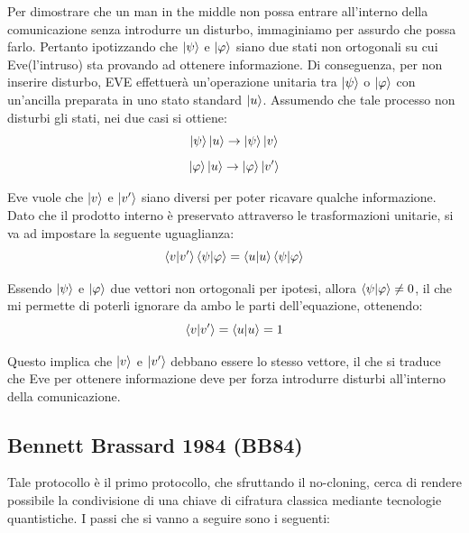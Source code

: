 \begin{info}
Per dimostrare che un man in the middle non possa entrare all'interno della comunicazione senza introdurre un disturbo, immaginiamo per assurdo che possa farlo. Pertanto ipotizzando che \(\ket{\psi}\) e \(\ket{\varphi}\) siano due stati non ortogonali su cui Eve(l'intruso) sta provando ad ottenere informazione. Di conseguenza, per non inserire disturbo, EVE effettuerà un'operazione unitaria tra \(\ket{\psi}\) o \(\ket{\varphi}\) con un'ancilla preparata in uno stato standard \(\ket{u}\). Assumendo che tale processo non disturbi gli stati, nei due casi si ottiene:
\[
\ket{\psi}\ket{u}\rightarrow \ket{\psi}\ket{v}
\]
\[
\ket{\varphi}\ket{u} \rightarrow \ket{\varphi}\ket{v'}
\]

Eve vuole che \(\ket{v}\) e \(\ket{v'}\) siano diversi per poter ricavare qualche informazione. Dato che il prodotto interno è preservato attraverso le trasformazioni unitarie, si va ad impostare la seguente uguaglianza:
\[
\braket{v | v'} \braket{\psi | \varphi} = \braket{u | u} \braket{\psi | \varphi}
\]

Essendo \(\ket{\psi}\) e \(\ket{\varphi}\) due vettori non ortogonali per ipotesi, allora \(\braket{\psi | \varphi} \ne 0\), il che mi permette di poterli ignorare da ambo le parti dell'equazione, ottenendo:
\[
\braket{v | v'} = \braket{u | u} = 1
\]
\end{info}

Questo implica che \(\ket{v}\) e \(\ket{v'}\) debbano essere lo stesso vettore, il che si traduce che Eve per ottenere informazione deve per forza introdurre disturbi all'interno della comunicazione.


\subsection{Bennett Brassard 1984 (BB84)}
Tale protocollo è il primo protocollo, che sfruttando il no-cloning, cerca di rendere possibile la condivisione di una chiave di cifratura classica mediante tecnologie quantistiche. I passi che si vanno a seguire sono i seguenti:

